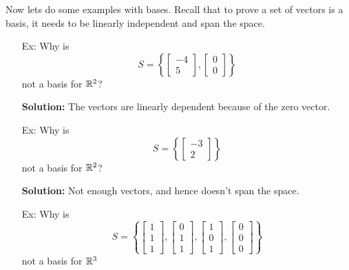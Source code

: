 \documentclass[reqno]{amsart}
\theoremstyle{definition}
\begin{document}
Now lets do some examples with bases.  Recall that to prove a set of vectors is a basis, it needs
to be linearly independent and span the space.

\begin{enumerate}

\item[Ex:  ]  Why is
%
\begin{equation*}
S = \left\lbrace \begin{bmatrix}
-4\\
5
\end{bmatrix}, \begin{bmatrix}
0\\
0
\end{bmatrix}\right\rbrace
\end{equation*}
%
not a basis for $\mathbb{R}^2$?

\textbf{Solution:  }  The vectors are linearly dependent because of the zero vector.

\item[Ex:  ]  Why is
%
\begin{equation*}
S = \left\lbrace\begin{bmatrix}
-3\\
2
\end{bmatrix}\right\rbrace
\end{equation*}
%
not a basis for $\mathbb{R}^2$?

\textbf{Solution:  }  Not enough vectors, and hence doesn't span the space.

\item[Ex:  ]  Why is
%
\begin{equation*}
S = \left\lbrace\begin{bmatrix}
1\\
1\\
1
\end{bmatrix}, \begin{bmatrix}
0\\
1\\
1
\end{bmatrix}, \begin{bmatrix}
1\\
0\\
1
\end{bmatrix}, \begin{bmatrix}
0\\
0\\
0
\end{bmatrix}\right\rbrace
\end{equation*}
%
not a basis for $\mathbb{R}^3$


\end{enumerate}
\end{document}
